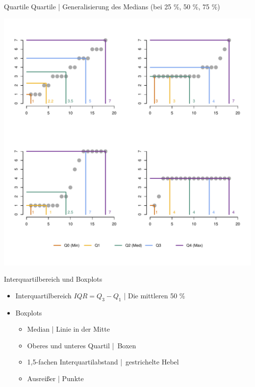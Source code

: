 \begin{frame}
  {Quartile}
  \alert{Quartile} | Generalisierung des Medians (bei 25 \%, 50 \%, 75 \%)\\
  \begin{center}
    \includegraphics[height=0.85\textheight]{RVorlesung/fourquartiles}
  \end{center}
\end{frame}


\begin{frame}
  {Interquartilbereich und Boxplots}
  \begin{itemize}[<+->]
    \item Interquartilbereich \alert{$IQR = Q_3-Q_1$} | Die mittleren 50 \%
     \Zeile 
    \item Boxplots
      \Viertelzeile
      \begin{itemize}[<+->]
        \item \alert{Median} | Linie in der Mitte
        \item \alert{Oberes und unteres Quartil} | Boxen
        \item \alert{1,5-fachen Interquartilabstand} | gestrichelte Hebel
        \item \alert{Ausreißer} | Punkte
      \end{itemize}
  \end{itemize}
\end{frame}


